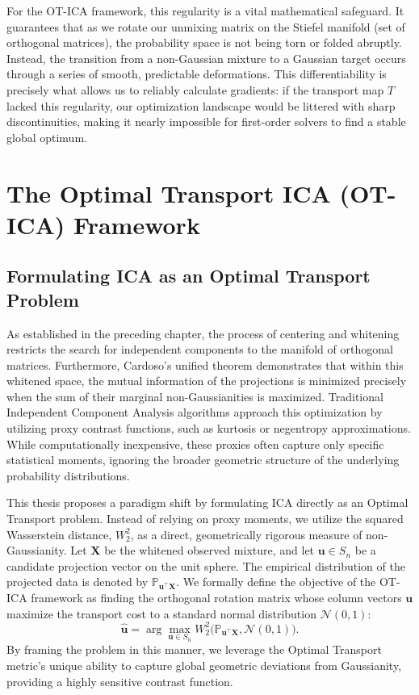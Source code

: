 \documentclass[12pt,a4paper,twoside,openany]{book}
\begin{document}
For the OT-ICA framework, this regularity is a vital mathematical safeguard. It guarantees that as we rotate our unmixing matrix on the Stiefel manifold (set of orthogonal matrices), 
the probability space is not being torn or folded abruptly. Instead, the transition from a non-Gaussian mixture to a Gaussian target occurs through a series of smooth, 
predictable deformations. This differentiability is precisely what allows us to reliably calculate gradients: if the transport map $T$ lacked this regularity, 
our optimization landscape would be littered with sharp discontinuities, making it nearly impossible for first-order solvers to find a stable global optimum.

\chapter{The Optimal Transport ICA (OT-ICA) Framework}

\section{Formulating ICA as an Optimal Transport Problem}
As established in the preceding chapter, the process of centering and whitening restricts the search for independent 
components to the manifold of orthogonal matrices. Furthermore, Cardoso's unified theorem \cite{cardoso2022} demonstrates 
that within this whitened space, the mutual information of the projections is minimized precisely when the sum of their 
marginal non-Gaussianities is maximized. Traditional Independent Component Analysis algorithms approach this optimization 
by utilizing proxy contrast functions, such as kurtosis or negentropy approximations. While computationally inexpensive, 
these proxies often capture only specific statistical moments, ignoring the broader geometric structure of the underlying probability distributions.

This thesis proposes a paradigm shift by formulating ICA directly as an Optimal Transport problem. Instead of relying on 
proxy moments, we utilize the squared Wasserstein distance, $W_2^2$, as a direct, geometrically rigorous measure of non-Gaussianity. 
Let $\mathbf{X}$ be the whitened observed mixture, and let $\mathbf{u} \in S_n$ be a candidate projection vector on the unit sphere. 
The empirical distribution of the projected data is denoted by $\mathbb{P}_{\mathbf{u}^\top \mathbf{X}}$. We formally define the 
objective of the OT-ICA framework as finding the orthogonal rotation matrix whose column vectors $\mathbf{u}$ maximize the 
transport cost to a standard normal distribution $\mathcal{N}(0,1)$:
\begin{equation}
    \hat{\mathbf{u}} = \arg\max_{\mathbf{u} \in S_n} W_2^2\big(\mathbb{P}_{\mathbf{u}^\top \mathbf{X}}, \mathcal{N}(0,1)\big).
\end{equation}
By framing the problem in this manner, we leverage the Optimal Transport metric's unique ability to capture global geometric 
deviations from Gaussianity, providing a highly sensitive contrast function.
\end{document}
